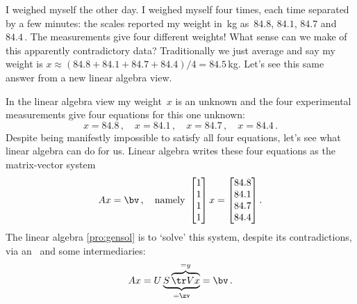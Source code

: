 \begin{example} \label{eg:fourwts}
I weighed myself the other day. 
I weighed myself four times, each time separated by a few minutes:  the scales reported my weight in~kg as~\(84.8\), \(84.1\), \(84.7\) and~\(84.4\)\,.
The measurements give four different weights!
What sense can we make of this apparently contradictory data?
Traditionally we just average and say my weight is \(x\approx (84.8+84.1+84.7+84.4)/4=84.5\)\,kg.
Let's see this same answer from a new linear algebra view.

In the linear algebra view my weight~\(x\) is an unknown and the four experimental measurements give four equations for this one unknown:
\begin{equation*}
x=84.8\,,\quad
x=84.1\,,\quad
x=84.7\,,\quad
x=84.4\,.
\end{equation*}
Despite being manifestly impossible to satisfy all four equations, let's see what linear algebra can do for us.
Linear algebra writes these four equations as the matrix-vector system
\begin{equation*}
Ax=\bv\,,\quad\text{namely }
\begin{bmatrix} 1\\1\\1\\1 \end{bmatrix}x
=\begin{bmatrix} 84.8\\84.1\\84.7\\84.4 \end{bmatrix}.
\end{equation*}
The linear algebra \autoref{pro:gensol} is to `solve' this system, despite its contradictions, via an \svd\ and some intermediaries:
\begin{equation*}
Ax=U\underbrace{S\overbrace{\tr Vx}^{=y}}_{=\zv}=\bv\,.
\end{equation*}


\end{example}
